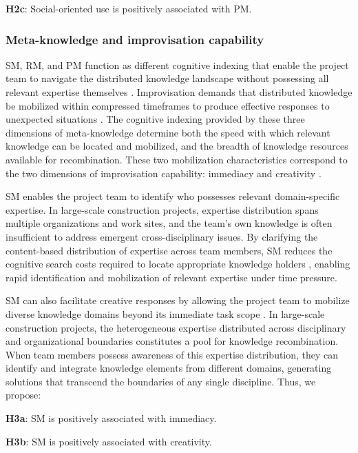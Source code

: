 \documentclass[authoryear,preprint,review,times,10pt]{elsarticle}
\begin{document}
\textbf{H2c}: Social-oriented use is positively associated with PM.

\subsubsection{Meta-knowledge and improvisation capability}
SM, RM, and PM function as different cognitive indexing that enable the project team to navigate the distributed knowledge landscape without possessing all relevant expertise themselves \citep{engelbrecht2019How, ye2021Leveraging}. Improvisation demands that distributed knowledge be mobilized within compressed timeframes to produce effective responses to unexpected situations \citep{magni2009Role}. The cognitive indexing provided by these three dimensions of meta-knowledge determine both the speed with which relevant knowledge can be located and mobilized, and the breadth of knowledge resources available for recombination. These two mobilization characteristics correspond to the two dimensions of improvisation capability: immediacy and creativity \citep{veranghg2005Improvisation}.

SM enables the project team to identify who possesses relevant domain-specific expertise. In large-scale construction projects, expertise distribution spans multiple organizations and work sites, and the team’s own knowledge is often insufficient to address emergent cross-disciplinary issues. By clarifying the content-based distribution of expertise across team members, SM reduces the cognitive search costs required to locate appropriate knowledge holders \citep{lewis2003Measuring}, enabling rapid identification and mobilization of relevant expertise under time pressure.

SM can also facilitate creative responses by allowing the project team to mobilize diverse knowledge domains beyond its immediate task scope \citep{ye2021Leveraging}. In large-scale construction projects, the heterogeneous expertise distributed across disciplinary and organizational boundaries constitutes a pool for knowledge recombination. When team members possess awareness of this expertise distribution, they can identify and integrate knowledge elements from different domains, generating solutions that transcend the boundaries of any single discipline. Thus, we propose:

\textbf{H3a}: SM is positively associated with immediacy.

\textbf{H3b}: SM is positively associated with creativity.
\end{document}
